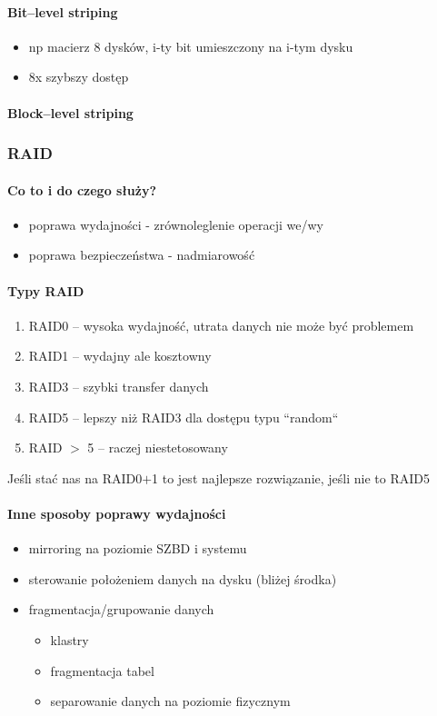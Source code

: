 \documentclass[12pt]{article}
\begin{document}
\paragraph{Bit--level striping}
\begin{itemize}
\item np macierz 8 dysków, i-ty bit umieszczony na i-tym dysku
\item 8x szybszy dostęp
\end{itemize}
\paragraph{Block--level striping}

\subsubsection{\ac{RAID}}
\paragraph{Co to i do czego służy?}
\begin{itemize}
\item poprawa wydajności - zrównoleglenie operacji we/wy
\item poprawa bezpieczeństwa - nadmiarowość
\end{itemize}

\paragraph{Typy \acs{RAID}}
\begin{enumerate}
\item \ac{RAID}0 -- wysoka wydajność, utrata danych nie może być problemem
\item \ac{RAID}1 -- wydajny ale kosztowny
\item \ac{RAID}3 -- szybki transfer danych
\item \ac{RAID}5 -- lepszy niż \ac{RAID}3 dla dostępu typu ``random``
\item \ac{RAID} $>$ 5 -- raczej niestetosowany
\end{enumerate}

Jeśli stać nas na \ac{RAID}0$+$1 to jest najlepsze rozwiązanie, jeśli nie to \ac{RAID}5

\paragraph{Inne sposoby poprawy wydajności}
\begin{itemize}
\item mirroring na poziomie \ac{SZBD} i systemu
\item sterowanie położeniem danych na dysku (bliżej środka)
\item fragmentacja/grupowanie danych
\begin{itemize}
\item klastry
\item fragmentacja tabel
\item separowanie danych na poziomie fizycznym
\end{itemize}
\end{itemize}
\end{document}
